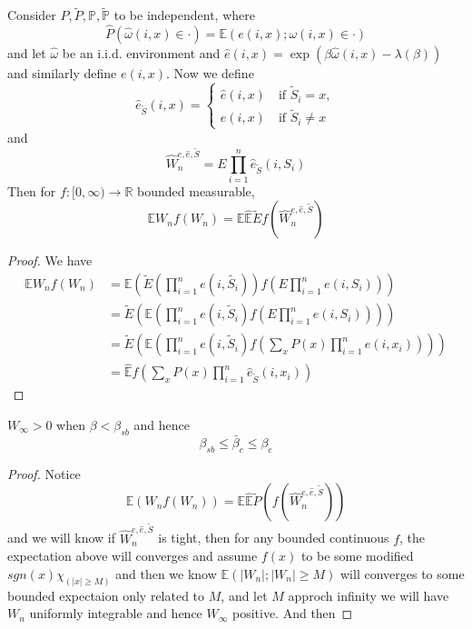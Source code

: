\begin{proposition}
    Consider $P,\tilde{P},\mathbb{P},\tilde{\mathbb{P}}$ to be independent, where
    \[
    \hat{P}(\hat\omega(i,x) \in \cdot) = \mathbb{E}(e(i,x); \omega(i,x)\in \cdot)
    \] and let $\hat{\omega}$ be an i.i.d. environment and $\hat{e}(i,x) = \exp(\beta\hat{\omega}(i,x) - \lambda(\beta))$ and similarly define $e(i,x)$. Now we define
    \[
    \hat{e}_{\tilde{S}}(i,x) = \begin{cases}
        \hat{e}(i,x)\quad\text{if }\tilde{S}_i = x,\\
        e(i,x)\quad\text{if }\tilde{S}_i \neq x
    \end{cases}
    \]
    and
    \[
    \hat{W}_n^{e,\hat{e},\tilde{S}} = E\prod_{i=1}^n \hat{e}_{\tilde{S}}(i,S_i)
    \]
    Then for $f:[0,\infty) \to \mathbb{R}$ bounded measurable,
    \[
    \mathbb{E} W_nf(W_n) = \mathbb{E}\hat{\mathbb{E}} \tilde{E}f( \hat{W}_n^{e,\hat{e},\tilde{S}})
    \]
\end{proposition}
\begin{proof}
    We have
    \[
    \begin{aligned}
        \mathbb{E}W_n f(W_n) &= \mathbb{E}\left(\tilde{E}\left(\prod_{i=1}^n e(i,\tilde{S_i})\right)f\left(E\prod_{i=1}^n e(i,S_i)\right)\right) \\
        & = \tilde{E}\left(\mathbb{E}\left(\prod_{i=1}^n e(i,\tilde{S}_i) f\left(E\prod_{i=1}^n e(i,S_i)\right)\right)\right) \\
        &=\tilde{E}\left(\mathbb{E}\left(\prod_{i=1}^n e(i,\tilde{S}_i) f\left(\sum_{x} P(x)\prod_{i=1}^n e(i,x_i)\right)\right)\right) \\
        &= \hat{\mathbb{E}}f\left(\sum_{x} P(x)\prod_{i=1}^n \hat{e}_{\tilde{S}}(i,x_i)\right)
    \end{aligned}
    \]
\end{proof}

\begin{theorem}
    $W_{\infty} > 0$ when $\beta < \beta_{sb}$ and hence
    \[
    \beta_{sb} \leq \bar{\beta}_c \leq \beta_c
    \]
\end{theorem}
\begin{proof}
    Notice
    \[
    \mathbb{E}(W_nf(W_n)) = \mathbb{E}\hat{\mathbb{E}}
\tilde{P}(f(\hat{W}_n^{e,\hat{e},\tilde{S}}))    \]
    and we will know if $\hat{W}_n^{e,\hat{e},\tilde{S}}$ is tight, then for any bounded continuous $f$, the expectation above will converges and assume $f(x)$ to be some modified $sgn(x)\chi_{(|x| \geq M)}$ and then we know $\mathbb{E}(|W_n|;|W_n| \geq M)$ will converges to some bounded expectaion only related to $M$, and let $M$ approch infinity we will have $W_n$ uniformly integrable and hence $W_{\infty}$ positive. And then 
\end{proof}

